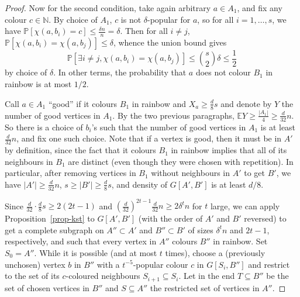 \documentclass[10pt,a4paper]{article}
\theoremstyle{plain}
\theoremstyle{definition}
\newcommand{\N}{\mathbb{N}}
\newcommand{\expect}{\mathbb{E}}
\newcommand{\prob}{\mathbb{P}}
\begin{document}
\begin{proof}
    Now for the second condition, take again arbitrary $a\in A_1$, and fix any colour $c\in\N$. By choice of $A_1$, $c$ is not $\delta$-popular for $a$, so for all $i=1,\dots,s$, we have $\prob[\chi(a,b_i)=c]\le\frac{\delta n}{n}=\delta$. Then for all $i\neq j$, $\prob[\chi(a,b_i)=\chi(a,b_j)]\le\delta$, whence the union bound gives
    $$\prob\left[\exists i\neq j,\chi(a,b_i)=\chi(a,b_j)\right]\le \binom{s}{2}\delta\le\frac{1}{2}$$
    by choice of $\delta$. In other terms, the probability that $a$ does not colour $B_1$ in rainbow is at most $1/2$.
    
    Call $a\in A_1$ ``good'' if it colours $B_1$ in rainbow and $X_a\ge\frac{d}{8}s$ and denote by $Y$ the number of good vertices in $A_1$. By the two previous paragraphs, $\expect Y\ge \frac{|A_1|}{4}\ge\frac{d}{32}n$. So there is a choice of $b_i$'s such that the number of good vertices in $A_1$ is at least $\frac{d}{32}n$, and fix one such choice. Note that if a vertex is good, then it must be in $A'$ by definition, since the fact that it colours $B_1$ in rainbow implies that all of its neighbours in $B_1$ are distinct (even though they were chosen with repetition). In particular, after removing vertices in $B_1$ without neighbours in $A'$ to get $B'$, we have $|A'|\ge \frac{d}{32}n$, $s\ge|B'|\ge \frac{d}{8}s$, and density of $G[A',B']$ is at least $d/8$.

    Since $\frac{d}{32}\cdot\frac{d}{8}s\ge 2(2t-1)$ and $\left(\frac{d}{32}\right)^{2t-1} \frac{d}{32}n\ge 2\delta^t n$ for $t$ large, we can apply Proposition~\ref{prop-kst} to $G[A',B']$ (with the order of $A'$ and $B'$ reversed) to get a complete subgraph on $A''\subset A'$ and $B''\subset B'$ of sizes $\delta^t n$ and $2t-1$, respectively, and such that every vertex in $A''$ colours $B''$ in rainbow. Set $S_0=A''$. While it is possible (and at most $t$ times), choose a (previously unchosen) vertex $b$ in $B''$ with a $t^{-5}$-popular colour $c$ in $G[S_i,B'']$ and restrict to the set of its $c$-coloured neighbours $S_{i+1}\subseteq S_i$. Let in the end $T\subseteq B''$ be the set of chosen vertices in $B''$ and $S\subseteq A''$ the restricted set of vertices in $A''$. 
    

\end{proof}
\end{document}

